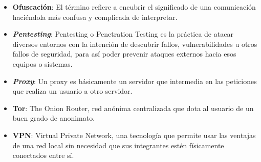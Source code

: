 \begin{itemize}
\item{\textbf{Ofuscación}: El término refiere a encubrir el significado de una comunicación haciéndola más confusa y complicada de interpretar.}
\item{\textbf{\textit{Pentesting}}: Pentesting o Penetration Testing es la práctica de atacar diversos entornos con la intención de descubrir fallos, vulnerabilidades u otros fallos de seguridad, para así poder prevenir ataques externos hacia esos equipos o sistemas.}
\item{\textbf{\textit{Proxy}}: Un proxy es básicamente un servidor que intermedia en las peticiones que realiza un usuario a otro servidor.}
\item{\textbf{Tor}: The Onion Router, red anónima centralizada que dota al usuario de un buen grado de anonimato.}
\item{\textbf{VPN}: Virtual Private Network, una tecnología que permite usar las ventajas de una red local sin necesidad que sus integrantes estén físicamente conectados entre sí.}
\end{itemize}

\newpage \thispagestyle{empty} %

